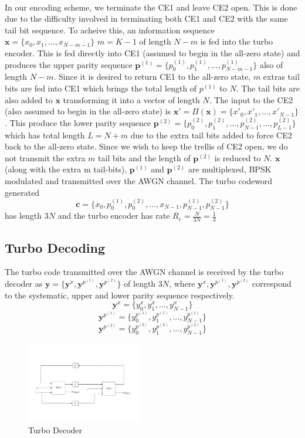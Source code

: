 \documentclass[twocolumn]{article}
\begin{document}
\paragraph{}
In our encoding scheme, we terminate the CE1 and leave CE2 open. This is done due
to the difficulty involved in terminating both CE1 and CE2 with the same tail bit 
sequence.
To acheive this,	
 an information sequence $\mathbf{x}=\{x_0,x_1,...,x_{N-m-1} \} $
$m=K-1$
of length $N-m$ is fed into the turbo encoder. This is fed directly into CE1 (assumed to 
begin in the all-zero state) and produces the upper parity sequence 
$\mathbf{p}^{(1)}=\{p^{(1)}_0,p^{(1)}_1,...,p^{(1)}_{N-m-1} \}$ also of 
length $N-m$. 
Since it is desired to return CE1 to the all-zero state, $m$ extras tail bits 
are fed into CE1 which brings the total length of $p^{(1)}$ to $N$. The tail bits are
also added to $\mathbf{x}$ transforming it into a vector of length $N$.
The input to the CE2 (also assumed to 
begin in the all-zero state) is 
$\mathbf{x'}=\Pi(\mathbf{x})= \{x'_0,x'_1,...,x'_{N-1} \} $. This produce the lower 
parity sequence 
$\mathbf{p}^{(2)}=\{p^{(2)}_0,p^{(2)}_1,...,p^{(2)}_{N-1},...,p^{(2)}_{L-1} \}$
 which has total length $L=N+m$ due to the extra tail bits added to force CE2 back to the
 all-zero state. Since we wish to keep the trellis of CE2 open, we do not transmit the
 extra $m$ tail bits and the length of $\mathbf{p}^{(2)}$ is reduced to $N$.
 $\mathbf{x}$ (along with the extra m tail-bits), $\mathbf{p}^{(1)}$
 and $\mathbf{p}^{(2)}$ are multiplexed, BPSK modulated and transmitted over the
 AWGN channel.
 The turbo codeword generated  
 $$\mathbf{c}=\{x_0,p^{(1)}_0,p^{(2)}_0,...,x_{N-1},p^{(1)}_{N-1},p^{(2)}_{N-1} \} $$ 
 has length $3N$ and the
 turbo encoder has rate $R_c=\frac{N}{3N} = \frac{1}{3}$
 
 
 \subsection{Turbo Decoding}
 The turbo code transmitted over the AWGN channel is received by the turbo decoder as
  $\mathbf{y}=\{\mathbf{y}^x,\mathbf{y}^{p^{(1)}},\mathbf{y}^{p^{(2)}}\}$ 
  of length $3N$, where $\mathbf{y}^x,\mathbf{y}^{p^{(1)}},\mathbf{y}^{p^{(2)}}$
    correspond to the systematic, upper and lower parity sequence respectively.
    $$\mathbf{y}^x=\{y^x_0, y^x_1,...,y^x_{N-1}\}$$ 
    $$\mathbf{y}^{p^{(1)}}=\{y^{p^{(1)}}_0, y^{p^{(1)}}_1,...,y^{p^{(1)}}_{N-1} \}$$
 $$\mathbf{y}^{p^{(2)}}=\{y^{p^{(2)}}_0, y^{p^{(2)}}_1,...,y^{p^{(2)}}_{N-1}\}$$
\begin{figure}[h!]
\centering
		\includegraphics[width=0.45\textwidth]{D1.pdf}
		\caption{Turbo Decoder}
		\label{TDC}
		\end{figure}
	
\end{document}
